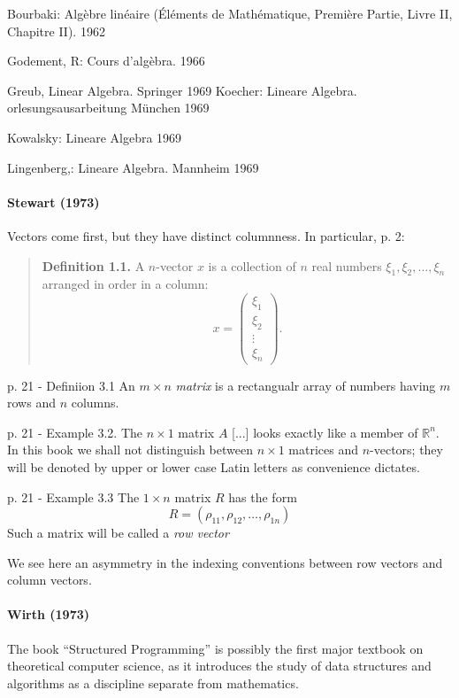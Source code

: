 Bourbaki: Algèbre linéaire (Éléments de Mathématique, Première Partie, Livre II, Chapitre II). 1962

Godement, R: Cours d'algèbra. 1966

Greub, Linear Algebra. Springer 1969
Koecher: Lineare Algebra. orlesungsausarbeitung München 1969

Kowalsky: Lineare Algebra 1969

Lingenberg,: Lineare Algebra. Mannheim 1969


\paragraph{Stewart (1973)~\cite{Stewart1973}}

Vectors come first, but they have distinct columnness. In particular, p. 2:

\begin{quote}
    \textbf{Definition 1.1.} A $n$-vector $x$ is a collection of $n$ real numbers
    $\xi_1, \xi_2, \dots, \xi_n$ arranged in order in a column:
    \[
        x = \begin{pmatrix}\xi_1\\\xi_2\\\vdots\\\xi_n\end{pmatrix}.
    \]
\end{quote}

p. 21 - Definiion 3.1 An $m\times n$ \textit{matrix} is a rectangualr array of numbers
having $m$ rows and $n$ columns.

p. 21 - Example 3.2. The $n\times1$ matrix $A$ [...] looks exactly like a member of $\mathbb R^n$. In this book
we shall not distinguish between $n\times1$ matrices and $n$-vectors; they will be denoted by
upper or lower case Latin letters as convenience dictates.

p. 21 - Example 3.3 The $1\times n$ matrix $R$ has the form
\[
    R = (\rho_{11},\rho_{12},\dots,\rho_{1n})
\]
Such a matrix will be called a \textit{row vector}

We see here an asymmetry in the indexing conventions between row vectors and
column vectors.

\paragraph{Wirth (1973)~\cite{Wirth1973}}

The book ``Structured Programming'' is possibly the first major textbook on theoretical computer science, as it introduces the study of data structures and algorithms as a discipline separate from mathematics.

